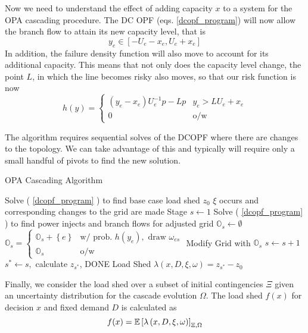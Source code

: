 Now we need to understand the effect of adding capacity $x$ to a system for the OPA cascading procedure.  The DC OPF (eqs. \ref{dcopf_program}) will now allow the branch flow to attain its new capacity level, that is
\begin{equation}
 y_e  \in \left[ - U_e - x_e, U_e + x_e \right]
\end{equation}
In addition, the failure density function will also move to account for its additional capacity.  This means that not only does the capacity level change, the point $L$, in which the line becomes risky also moves, so that our risk function is now
\begin{equation}
h(y) = \left\{ \begin{array}{ll}
(y_e-x_e)U_e^{-1}p - Lp & y_e > L U_e + x_e \\
0 & \mbox{o/w}
\end{array}
\right. 
\end{equation}

The algorithm requires sequential solves of the DCOPF where there are changes to the topology. We can take advantage of this and typically will require only a small handful of pivots to find the new solution.
\begin{algorithm}
\caption{OPA Cascading Algorithm}\label{opa_alg}
\begin{algorithmic}
\State Solve ( \ref{dcopf_program} ) to find base case load shed $z_0$
\State $\xi$ occurs and corresponding changes to the grid are made
\State Stage $s \gets 1$
\State Solve ( \ref{dcopf_program} ) to find power injects and branch flows for adjusted grid
\State $\mathbb{O}_s \gets \emptyset$
\State $\mathbb{O}_s = 
\left\{ 
\begin{array}{lr}
  \mathbb{O}_s + \left\{ e \right\} & \mbox{w/ prob. } h(y_e), \mbox{ draw } \omega_{es} \\
  \mathbb{O}_s & \mbox{o/w }
\end{array}
\right. $ 
\State Modify Grid with $\mathbb{O}_s$
\State $s\gets s+1$
\Else
\State $s^* \gets s,$ calculate $z_{s^*}$, DONE
\EndIf
\EndFor
\EndWhile
\State \label{done}Load Shed $  \lambda\left(x,D,\xi,\omega\right)  = z_{s^*} - z_0$
\EndProcedure
\end{algorithmic}
\end{algorithm}


Finally, we consider the load shed over a subset of initial contingencies $\Xi$ given an uncertainty distribution for the cascade evolution $\Omega$.  The load shed $f (x) $  for decision $x$ and fixed demand $D$ is calculated as 
\begin{equation}
f(x) = \mathbb{E}\left[   \lambda\left(x,D,\xi,\omega\right)   \right]_{\Xi,\Omega}
\end{equation}

